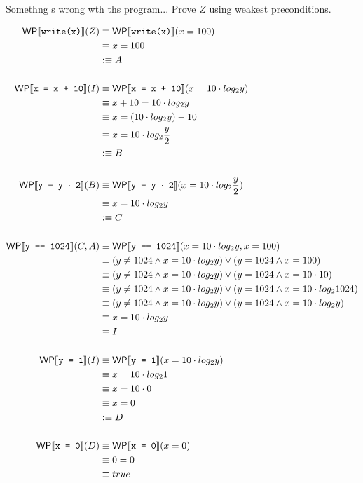 \documentclass[
  english
]{tumteaching}
\begin{document}
\begin{assignment}[H, points=3]{Somethng s wrong wth ths program...}
	Prove $Z$ using weakest preconditions.
	\begin{center}
		\begin{tikzpicture}
			
		\end{tikzpicture}
	\end{center}
	
	\begin{align*}
		\WP{write(x)}(Z)
		&\equiv \WP{write(x)}(x = 100) \\
		&\equiv x = 100 \\
		&\defequiv A \\
		\\
		\WP{x = x + 10}(I)
		&\equiv \WP{x = x + 10}(x = 10 \cdot log_{2}{y}) \\
		&\equiv x + 10 = 10 \cdot log_{2}{y} \\
		&\equiv x = (10 \cdot log_{2}{y}) - 10 \\
		&\equiv x = 10 \cdot log_{2}{\frac{y}{2}} \\
		&\defequiv B \\
		\\
		\WP{y = y $\cdot$ 2}(B)
		&\equiv \WP{y = y $\cdot$ 2}(x = 10 \cdot log_{2}{\frac{y}{2}}) \\
		&\equiv x = 10 \cdot log_{2}{y} \\
		&\defequiv C \\
		\\
		\WP{y == 1024}(C, A)
		&\equiv \WP{y == 1024}(x = 10 \cdot log_{2}{y}, x = 100) \\
		&\equiv (y \neq 1024 \land x = 10 \cdot log_{2}{y}) \lor (y = 1024 \land x = 100) \\
		&\equiv (y \neq 1024 \land x = 10 \cdot log_{2}{y}) \lor (y = 1024 \land x = 10 \cdot 10) \\
		&\equiv (y \neq 1024 \land x = 10 \cdot log_{2}{y}) \lor (y = 1024 \land x = 10 \cdot log_{2}{1024}) \\
		&\equiv (y \neq 1024 \land x = 10 \cdot log_{2}{y}) \lor (y = 1024 \land x = 10 \cdot log_{2}{y}) \\
		&\equiv x = 10 \cdot log_{2}{y} \\
		&\equiv I \\
		\\
		\WP{y = 1}(I)
		&\equiv \WP{y = 1}(x = 10 \cdot log_{2}{y}) \\
		&\equiv x = 10 \cdot log_{2}{1} \\
		&\equiv x = 10 \cdot 0 \\
		&\equiv x = 0 \\
		&\defequiv D \\
		\\
		\WP{x = 0}(D)
		&\equiv \WP{x = 0}(x = 0) \\
		&\equiv 0 = 0 \\
		&\equiv true \\
	\end{align*}
\end{assignment}
\clearpage
\end{document}
